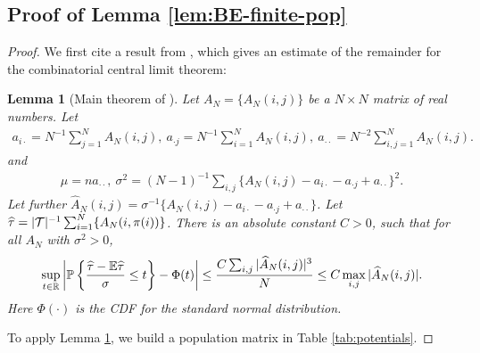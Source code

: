 \documentclass[12pt]{article}
\newtheorem{lemma}{Lemma}
\begin{document}
\subsection{Proof of Lemma \ref{lem:BE-finite-pop}}
\begin{proof}
We first cite a result from \cite{bolthausen1984estimate}, which gives an estimate of the remainder for the combinatorial central limit theorem:
\begin{lemma}[Main theorem  of \cite{bolthausen1984estimate}]\label{lem:BE}
Let $A_N = \{A_N(i,j)\}$ be a $N \times N$ matrix of real numbers. Let
\begin{align*}
    a_{i\cdot} = N^{-1}\sum_{j=1}^NA_N(i,j),~ a_{\cdot j} = N^{-1}\sum_{i=1}^NA_N(i,j),~ a_{\cdot\cdot} = N^{-2}\sum_{i,j=1}^NA_N(i,j).
\end{align*}
and 
\begin{align*}
    \mu = na_{\cdot\cdot},~ \sigma^2 = (N-1)^{-1}\sum_{i,j} \{A_N(i,j) - a_{i \cdot } - a_{\cdot j} + a_{\cdot\cdot}\}^2.
\end{align*}
Let further $\hat{A}_N(i,j) = \sigma^{-1}\{A_N(i,j) - a_{i\cdot} - a_{\cdot j} + a_{\cdot\cdot}\}$. Let $\widehat{\tau} = |{\mathcal{T}}|^{-1}\sum_{i=1}^N \{A_N(i,\pi(i))\}$. There is an absolute constant $C > 0$, such that for all $A_N$ with $\sigma^2 > 0$,
\begin{align*}
    \sup_{t\in{\mathbb{R}}} \left|{\mathbb{P}}\left\{\frac{{\widehat{\tau}} - {\mathbb{E}}{\widehat{\tau}}}{\sigma}\le t\right\} - \Phi(t)\right| \le \frac{C\sum_{i,j}|\widehat{A}_N(i,j)|^3 }{N} \le {C\max_{i,j}|\widehat{A}_N(i,j)|}.
\end{align*}
Here $\Phi(\cdot)$ is the CDF for the standard normal distribution.
\end{lemma}

To apply Lemma \ref{lem:BE}, we build a population matrix in Table \ref{tab:potentials}.





\end{proof}
\end{document}
